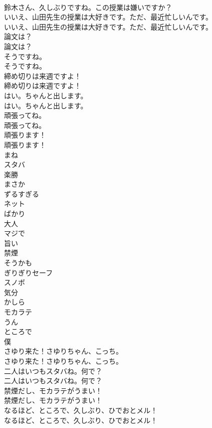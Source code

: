 \documentclass[8pt]{extreport}
\begin{document}
\begin{CJK}{UTF8}{min}
\\	鈴木さん、久しぶりですね。この授業は嫌いですか？ 
\\	いいえ、山田先生の授業は大好きです。ただ、最近忙しいんです。	
\\	いいえ、山田先生の授業は大好きです。ただ、最近忙しいんです。 
\\	論文は？	
\\	論文は？ 
\\	そうですね。	
\\	そうですね。 
\\	締め切りは来週ですよ！	
\\	締め切りは来週ですよ！ 
\\	はい。ちゃんと出します。	
\\	はい。ちゃんと出します。 
\\	頑張ってね。	
\\	頑張ってね。 
\\	頑張ります！	
\\	頑張ります！ 
\\	まね
\\	スタバ
\\	楽勝
\\	まさか
\\	ずるすぎる
\\	ネット
\\	ばかり
\\	大人
\\	マジで
\\	旨い
\\	禁煙
\\	そうかも
\\	ぎりぎりセーフ
\\	スノボ
\\	気分
\\	かしら
\\	モカラテ
\\	うん
\\	ところで
\\	僕
\\	さゆり来た！さゆりちゃん、こっち。	
\\	さゆり来た！さゆりちゃん、こっち。 
\\	二人はいつもスタバね。何で？	
\\	二人はいつもスタバね。何で？ 
\\	禁煙だし、モカラテがうまい！	
\\	禁煙だし、モカラテがうまい！ 
\\	なるほど、ところで、久しぶり、ひでおとメル！	
\\	なるほど、ところで、久しぶり、ひでおとメル！ 

\end{CJK}
\end{document}
